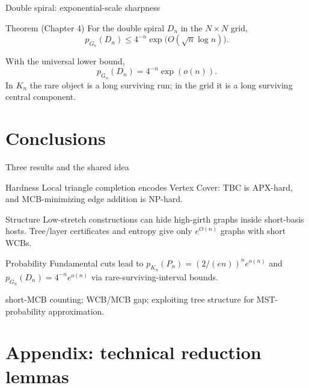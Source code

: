 \begin{frame}{Double spiral: exponential-scale sharpness}
 \begin{block}{Theorem (Chapter 4)}
 For the double spiral \(D_n\) in the \(N\times N\) grid,
 \[p_{G_n}(D_n)\le 4^{-n}\exp\bigl(O(\sqrt n\log n)\bigr).\]
 \end{block}
 With the universal lower bound,
 \[\boxed{p_{G_n}(D_n)=4^{-n}\exp(o(n))}.\]
 \vspace{.36cm}
  In \(K_n\) the rare object is a long surviving run; in the grid it is a long surviving central component.
\end{frame}


\section{Conclusions}


\begin{frame}{Three results and the shared idea}
 \begin{block}{Hardness}
 Local triangle completion encodes Vertex Cover:
 $\mathrm{TBC}$ is APX-hard, and MCB-minimizing edge addition is NP-hard.
 \end{block}
 \begin{block}{Structure}
 Low-stretch constructions can hide high-girth graphs inside short-basis hosts. Tree/layer certificates and entropy give only $e^{O(n)}$ graphs with short WCBs.
 \end{block}
 \begin{block}{Probability}
 Fundamental cuts lead to $p_{K_n}(P_n)=(2/(en))^n e^{o(n)}$ and $p_{G_n}(D_n)=4^{-n}e^{o(n)}$ via rare-surviving-interval bounds.
 \end{block}
 \small{} short-MCB counting; WCB/MCB gap; exploiting tree structure for MST-probability approximation.
\end{frame}


\section{Appendix: technical reduction lemmas}


